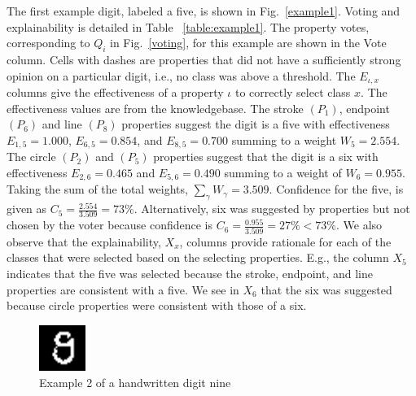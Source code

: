 \documentclass[conference]{IEEEtran}
\begin{document}
The first example  digit, labeled a five, is shown in Fig.~\ref{example1}.  Voting and explainability is detailed in Table ~\ref{table:example1}.  The property votes, corresponding to $Q_i$ in Fig.~\ref{voting}, for this example are shown in the Vote column.  Cells with dashes are properties that did not have a sufficiently strong opinion on a particular digit, i.e., no class was above a threshold.   The $E_{\iota,x}$ columns give the effectiveness of a property $\iota$ to correctly select class $x$.  The effectiveness values are from the knowledgebase.   The stroke $(P_1)$, endpoint $(P_6)$ and line $(P_8)$ properties suggest the digit is a five with effectiveness $E_{1,5}= 1.000$, $E_{6,5}=0.854$, and $E_{8,5}=0.700$ summing to a weight $W_5=2.554$.  The circle $(P_2)$ and $(P_5)$ properties suggest that the digit is a six with effectiveness $E_{2,6}=0.465$ and $E_{5,6}=0.490$  summing to a weight of $W_6=0.955$.  Taking the sum of the total weights, $\sum\limits_\gamma W_\gamma=3.509$.  Confidence for the five, is given as $C_5=\frac{2.554}{3.509} = 73\%$.  Alternatively, six was suggested by properties but not chosen by the voter because confidence is $C_6=\frac{0.955}{3.509}=27\% < 73\%$.  We also observe that the explainability, $X_x$, columns provide rationale for each of the classes that were selected based on the selecting properties.   E.g.,  the column $X_5$ indicates that the five was selected because the stroke, endpoint, and line properties are consistent with a five.   We see in $X_6$ that the six was suggested because circle properties were consistent with those of a six. 

 \begin{figure}[htbp]
\centerline{\includegraphics[width=15mm]{./digit-images/9-9.png}}
\caption{Example 2 of a handwritten digit nine}
\label{example2}
\end{figure}

\end{document}
